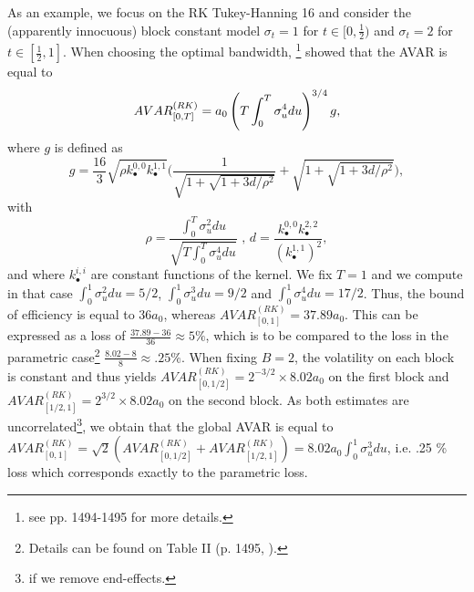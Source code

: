 \documentclass[11pt]{article}
\numberwithin{equation}{section}
\theoremstyle{plain}
\theoremstyle{remark}
\begin{document}
\smallskip
As an example, we focus on the RK Tukey-Hanning 16 and consider the (apparently innocuous) block constant model $\sigma_t = 1$ for $t \in [0,\frac{1}{2})$ and $\sigma_t = 2$ for $t \in [\frac{1}{2},1]$. When choosing the optimal bandwidth, \cite{barndorff2008designing}\footnote{see pp. 1494-1495 for more details.} showed that the AVAR is equal to
\begin{eqnarray}
\label{AVAR}
AVAR_{[0,T]}^{(RK)} = a_0 \left( T \int_0^T \sigma_u^4 du \right)^{3/4} g,
\end{eqnarray}
where $g$ is defined as
$$g = \frac{16}{3} \sqrt{\rho k_{\bullet}^{0,0} k_{\bullet}^{1,1}} \bigg( \frac{1}{\sqrt{1 + \sqrt{1 + 3 d / \rho^2}}} + \sqrt{1 + \sqrt{1 + 3 d / \rho^2}} \bigg),$$
with
$$\rho = \frac{\int_0^T \sigma_u^2 du}{\sqrt{T\int_0^T \sigma_u^4 du}} \text{   ,   } d = \frac{k_{\bullet}^{0,0} k_{\bullet}^{2,2}}{ (k_{\bullet}^{1,1})^2},$$
and where $k_{\bullet}^{i,i}$ are constant functions of the kernel. We fix $T=1$ and we compute in that case $\int_0^1 \sigma_u^2 du = 5/2$, $\int_0^1 \sigma_u^3 du = 9/2$ and $\int_0^1 \sigma_u^4 du = 17/2$. Thus, the bound of efficiency is equal to $36 a_0$, whereas $AVAR_{[0,1]}^{(RK)} = 37.89 a_0$. This can be expressed as a loss of $\frac{37.89 - 36}{36} \approx 5 \%$, which is to be compared to the loss in the parametric case\footnote{Details can be found on Table II (p. 1495, \cite{barndorff2008designing}).} $\frac{8.02 - 8}{8} \approx .25 \%$. When fixing $B=2$, the volatility on each block is constant and thus yields $AVAR_{[0,1/2]}^{(RK)} = 2^{-3/2} \times 8.02 a_0$ on the first block and $AVAR_{[1/2,1]}^{(RK)} = 2^{3/2} \times 8.02 a_0$ on the second block. As both estimates are uncorrelated\footnote{if we remove end-effects.}, we obtain that the global AVAR is equal to $AVAR_{[0,1]}^{(RK)} = \sqrt{2} (AVAR_{[0,1/2]}^{(RK)} + AVAR_{[1/2,1]}^{(RK)}) = 8.02 a_0 \int_0^1 \sigma_u^3 du$, i.e. .25 \% loss which corresponds exactly to the parametric loss.
\end{document}
